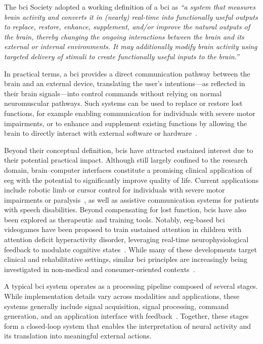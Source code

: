 
The \gls{bci} Society adopted a working definition of a \gls{bci} as \emph{``a system that measures brain activity and converts it in (nearly) real-time into functionally useful outputs to replace, restore, enhance, supplement, and/or improve the natural outputs of the brain, thereby changing the ongoing interactions between the brain and its external or internal environments. It may additionally modify brain activity using targeted delivery of stimuli to create functionally useful inputs to the brain.''}~\cite{bci-soc}


In practical terms, a \gls{bci} provides a direct communication pathway between the brain and an external device, translating the user’s intentions---as reflected in their brain signals---into control commands without relying on normal neuromuscular pathways. Such systems can be used to replace or restore lost functions, for example enabling communication for individuals with severe motor impairments, or to enhance and supplement existing functions by allowing the brain to directly interact with external software or hardware~\cite{bci-soc}.

Beyond their conceptual definition, \gls{bci}s have attracted sustained interest due to their potential practical impact. Although still largely confined to the research domain, brain–computer interfaces constitute a promising clinical application of \gls{eeg} with the potential to significantly improve quality of life. Current applications include robotic limb or cursor control for individuals with severe motor impairments or paralysis~\cite{ding-2025}, as well as assistive communication systems for patients with speech disabilities. Beyond compensating for lost function, \gls{bci}s have also been explored as therapeutic and training tools. Notably, \gls{eeg}-based \gls{bci} videogames have been proposed to train sustained attention in children with attention deficit hyperactivity disorder, leveraging real-time neurophysiological feedback to modulate cognitive states~\cite{munoz-2015}. While many of these developments target clinical and rehabilitative settings, similar \gls{bci} principles are increasingly being investigated in non-medical and consumer-oriented contexts~\cite{varbu-2022}.

A typical \gls{bci} system operates as a processing pipeline composed of several stages. While implementation details vary across modalities and applications, these systems generally include signal acquisition, signal processing, command generation, and an application interface with feedback~\cite{wang-2025}. Together, these stages form a closed-loop system that enables the interpretation of neural activity and its translation into meaningful external actions.

